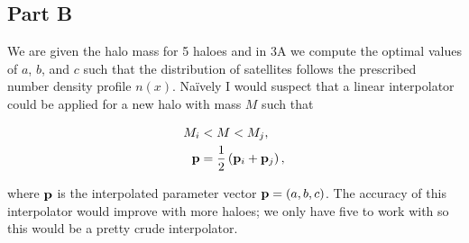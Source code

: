 \subsection{Part B}

We are given the halo mass for 5 haloes and in 3A we compute the optimal values of $a$, $b$, and $c$ such that the distribution of satellites follows the prescribed number density profile $n(x)$. Na\"{i}vely I would suspect that a linear interpolator could be applied for a new halo with mass $M$ such that

\begin{align}
M_{i} &< M < M_{j}, \\
\mathbf{p} &= {1\over 2} \left(\mathbf{p}_{i} + \mathbf{p}_{j}\right),
\end{align}

where $\mathbf{p}$ is the interpolated parameter vector $\mathbf{p} = (a,b,c)$. The accuracy of this interpolator would improve with more haloes; we only have five to work with so this would be a pretty crude interpolator.


